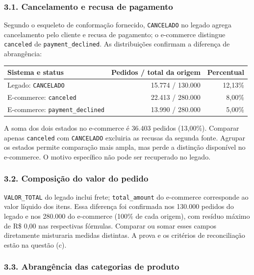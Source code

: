 \documentclass[11pt,a4paper]{article}
\begin{document}
\subsubsection{3.1. Cancelamento e recusa de
pagamento}\label{cancelamento-e-recusa-de-pagamento}

Segundo o esqueleto de conformação fornecido, \texttt{CANCELADO} no
legado agrega cancelamento pelo cliente e recusa de pagamento; o
e-commerce distingue \texttt{canceled} de \texttt{payment\_declined}. As
distribuições confirmam a diferença de abrangência:

\begin{longtable}[]{@{}lrr@{}}
\toprule\noalign{}
Sistema e status & Pedidos / total da origem & Percentual \\
\midrule\noalign{}
\endhead
\bottomrule\noalign{}
\endlastfoot
Legado: \texttt{CANCELADO} & 15.774 / 130.000 & 12,13\% \\
E-commerce: \texttt{canceled} & 22.413 / 280.000 & 8,00\% \\
E-commerce: \texttt{payment\_declined} & 13.990 / 280.000 & 5,00\% \\
\end{longtable}

A soma dos dois estados no e-commerce é 36.403 pedidos (13,00\%).
Comparar apenas \texttt{canceled} com \texttt{CANCELADO} excluiria as
recusas da segunda fonte. Agrupar os estados permite comparação mais
ampla, mas perde a distinção disponível no e-commerce. O motivo
específico não pode ser recuperado no legado.

\subsubsection{3.2. Composição do valor do
pedido}\label{composiuxe7uxe3o-do-valor-do-pedido}

\texttt{VALOR\_TOTAL} do legado inclui frete; \texttt{total\_amount} do
e-commerce corresponde ao valor líquido dos itens. Essa diferença foi
confirmada nos 130.000 pedidos do legado e nos 280.000 do e-commerce
(100\% de cada origem), com resíduo máximo de R\$ 0,00 nas respectivas
fórmulas. Comparar ou somar esses campos diretamente misturaria medidas
distintas. A prova e os critérios de reconciliação estão na questão (c).

\subsubsection{3.3. Abrangência das categorias de
produto}\label{abranguxeancia-das-categorias-de-produto}
\end{document}
